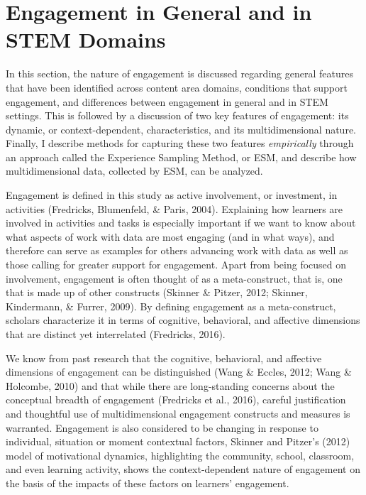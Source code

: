 \documentclass[]{msu-thesis}
\theoremstyle{definition}
\theoremstyle{definition}
\theoremstyle{definition}
\theoremstyle{remark}
\begin{document}
\section{Engagement in General and in STEM
Domains}\label{engagement-in-general-and-in-stem-domains}

In this section, the nature of engagement is discussed regarding general
features that have been identified across content area domains,
conditions that support engagement, and differences between engagement
in general and in STEM settings. This is followed by a discussion of two
key features of engagement: its dynamic, or context-dependent,
characteristics, and its multidimensional nature. Finally, I describe
methods for capturing these two features \emph{empirically} through an
approach called the Experience Sampling Method, or ESM, and describe how
multidimensional data, collected by ESM, can be analyzed.

Engagement is defined in this study as active involvement, or
investment, in activities (Fredricks, Blumenfeld, \& Paris, 2004).
Explaining how learners are involved in activities and tasks is
especially important if we want to know about what aspects of work with
data are most engaging (and in what ways), and therefore can serve as
examples for others advancing work with data as well as those calling
for greater support for engagement. Apart from being focused on
involvement, engagement is often thought of as a meta-construct, that
is, one that is made up of other constructs (Skinner \& Pitzer, 2012;
Skinner, Kindermann, \& Furrer, 2009). By defining engagement as a
meta-construct, scholars characterize it in terms of cognitive,
behavioral, and affective dimensions that are distinct yet interrelated
(Fredricks, 2016).

We know from past research that the cognitive, behavioral, and affective
dimensions of engagement can be distinguished (Wang \& Eccles, 2012;
Wang \& Holcombe, 2010) and that while there are long-standing concerns
about the conceptual breadth of engagement (Fredricks et al., 2016),
careful justification and thoughtful use of multidimensional engagement
constructs and measures is warranted. Engagement is also considered to
be changing in response to individual, situation or moment contextual
factors, Skinner and Pitzer's (2012) model of motivational dynamics,
highlighting the community, school, classroom, and even learning
activity, shows the context-dependent nature of engagement on the basis
of the impacts of these factors on learners' engagement.
\end{document}
